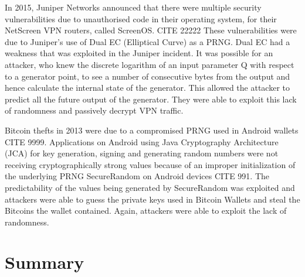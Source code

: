 In 2015, Juniper Networks announced that there were multiple security vulnerabilities due to unauthorised code in their operating system, for their NetScreen VPN routers, called ScreenOS. CITE 22222 These vulnerabilities were due to Juniper's use of Dual EC (Elliptical Curve) as a PRNG. Dual EC had a weakness that was exploited in the Juniper incident. It was possible for an attacker, who knew the discrete logarithm of an input parameter Q with respect to a generator point, to see a number of consecutive bytes from the output and hence calculate the internal state of the generator. This allowed the attacker to predict all the future output of the generator. They were able to exploit this lack of randomness and passively decrypt VPN traffic.\newline

Bitcoin thefts in 2013 were due to a compromised PRNG used in Android wallets CITE 9999. Applications on Android using Java Cryptography Architecture (JCA) for key generation, signing and generating random numbers were not receiving cryptographically strong values because of an improper initialization of the underlying PRNG SecureRandom on Android devices CITE 991. The predictability of the values being generated by SecureRandom was exploited and attackers were able to guess the private keys used in Bitcoin Wallets and steal the Bitcoins the wallet contained. Again, attackers were able to exploit the lack of randomness.\newline

\section{Summary}